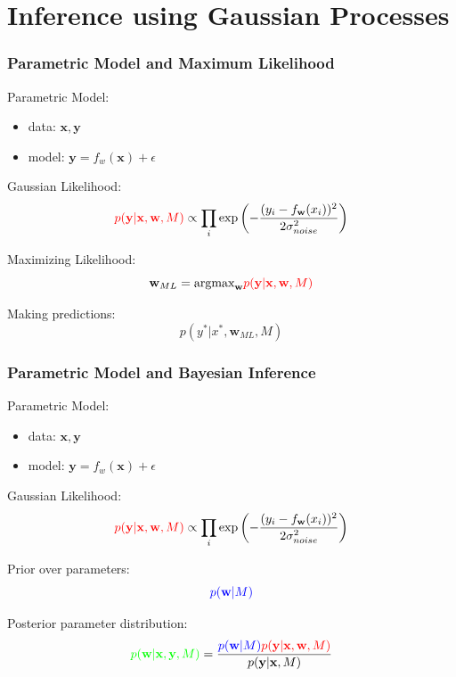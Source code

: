 \documentclass[10pt]{beamer}
\newcommand{\bx}{\mathbf{x}}
\newcommand{\by}{\mathbf{y}}
\newcommand{\bw}{\mathbf{w}}
\newcommand{\argmax}{\text{argmax}}
\begin{document}
  \section{Inference using Gaussian Processes}

  \begin{frame}
    \frametitle{Parametric Model and Maximum Likelihood}
    Parametric Model:
      \begin{itemize}
        \item data: $\bx, \by$
        \item model: $\by = f_w(\bx) + \epsilon$
      \end{itemize}

    Gaussian Likelihood:
      \begin{equation*}
        \textcolor{red}{p(\by|\bx, \bw, M)} \propto \prod_i \exp \left( - \frac{ (y_i - f_{\bw}(x_i))^2}{2 \sigma_{noise}^2} \right)
      \end{equation*}

    Maximizing Likelihood:
      \begin{equation*}
        \bw_{ML} = \argmax_{\bw} \textcolor{red}{p(\by|\bx,\bw,M)}
      \end{equation*}

    Making predictions:
      \begin{equation*}
        p(y^*|x^*,\bw_{ML},M)
      \end{equation*}
  \end{frame}

  \begin{frame}
    \frametitle{Parametric Model and Bayesian Inference}
    Parametric Model:
      \begin{itemize}
        \item data: $\bx, \by$
        \item model: $\by = f_w(\bx) + \epsilon$
      \end{itemize}

    Gaussian Likelihood:
      \begin{equation*}
        \textcolor{red}{p(\by|\bx, \bw, M)} \propto \prod_i \exp \left( - \frac{ (y_i - f_{\bw}(x_i))^2}{2 \sigma_{noise}^2} \right)
      \end{equation*}

    Prior over parameters:
      \begin{equation*}
        \textcolor{blue}{p(\bw|M)}
      \end{equation*}

    Posterior parameter distribution:
      \begin{equation*}
        \textcolor{green}{p(\bw|\bx,\by,M)} = \frac{\textcolor{blue}{p(\bw|M)} \textcolor{red}{p(\by|\bx, \bw, M)}}{p(\by|\bx,M)}
      \end{equation*}
  \end{frame}
\end{document}
